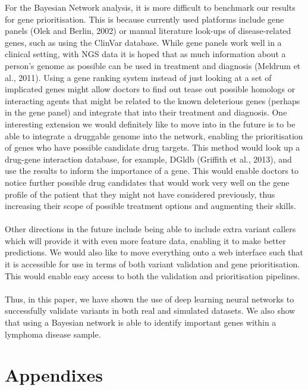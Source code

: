 \documentclass{article}
\begin{document}
For the Bayesian Network analysis, it is more difficult to benchmark our results for gene prioritisation. This is because currently used platforms include gene panels (Olek and Berlin, 2002) or manual literature look-ups of disease-related genes, such as using the ClinVar database. While gene panels work well in a clinical setting, with NGS data it is hoped that as much information about a person's genome as possible can be used in treatment and diagnosis (Meldrum et al., 2011). Using a gene ranking system instead of just looking at a set of implicated genes might allow doctors to find out tease out possible homologs or interacting agents that might be related to the known deleterious genes (perhaps in the gene panel) and integrate that into their treatment and diagnosis. One interesting extension we would definitely like to move into in the future is to be able to integrate a druggable genome into the network, enabling the prioritisation of genes who have possible candidate drug targets. This method would look up a drug-gene interaction database, for example, DGldb (Griffith et al., 2013), and use the results to inform the importance of a gene. This would enable doctors to notice further possible drug candidates that would work very well on the gene profile of the patient that they might not have considered previously, thus increasing their scope of possible treatment options and augmenting their skills. \\\\

Other directions in the future include being able to include extra variant callers which will provide it with even more feature data, enabling it to make better predictions. We would also like to move everything onto a web interface such that it is accessible for use in terms of both variant validation and gene prioritisation. This would enable easy access to both the validation and prioritisation pipelines. \\\\

Thus, in this paper, we have shown the use of deep learning neural networks to successfully validate variants in both real and simulated datasets. We also show that using a Bayesian network is able to identify important genes within a lymphoma disease sample.


\newpage
\section{Appendixes}
\end{document}

